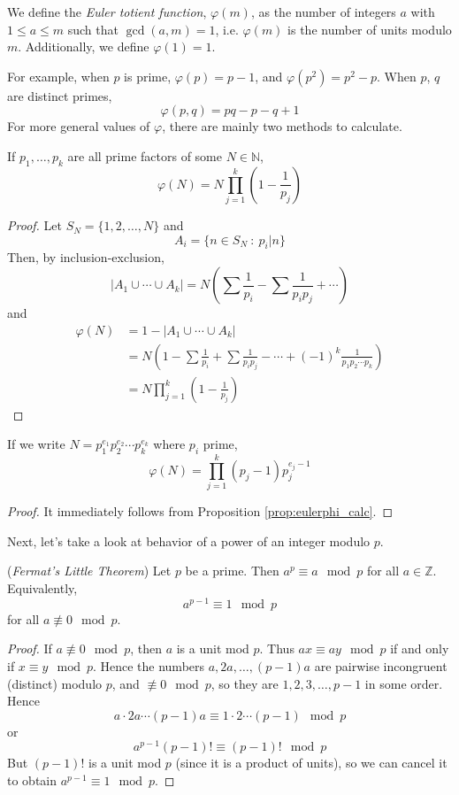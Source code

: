 \documentclass[10pt, a4paper, twoside]{report}
\begin{document}
\begin{definition}
    We define the \emph{Euler totient function}, \(\varphi(m)\), as the number of integers \(a\) with \(1\leq a\leq m\) such that \(\gcd(a,m)=1\), i.e. \(\varphi(m)\) is the number of units modulo \(m\). Additionally, we define \(\varphi(1)=1\).
\end{definition}
For example, when \(p\) is prime, \(\varphi(p)=p-1\), and \(\varphi(p^2)=p^2-p\). When \(p\), \(q\) are distinct primes,
\[\varphi(p,q)=pq-p-q+1\]
For more general values of \(\varphi\), there are mainly two methods to calculate.
\begin{proposition}
    If \(p_1,\ldots,p_k\) are all prime factors of some \(N\in\mathbb{N}\),
    \[\varphi(N)=N\prod_{j=1}^k\left(1-\frac{1}{p_j}\right)\]
    \label{prop:eulerphi_calc}
\end{proposition}
\begin{proof}
    Let \(S_N=\{1,2,\ldots,N\}\) and 
    \[A_i=\{n\in S_N\::\:p_i|n\}\]
    Then, by inclusion-exclusion,
    \[|A_1\cup\cdots\cup A_{k}|=N\left(\sum\frac 1{p_i}-\sum\frac 1{p_ip_j}+\cdots\right)\]
    and 
    \begin{align*}
        \varphi(N)&=1-|A_1\cup\cdots\cup A_{k}| \\
        &=N\left(1-\sum\frac 1{p_i}+\sum\frac 1{p_ip_j}-\cdots+(-1)^k\frac{1}{p_1p_2\cdots p_k}\right) \\
        &=N\prod_{j=1}^{k}\left(1-\frac 1{p_j}\right)
    \end{align*}
\end{proof}
\begin{corollary}
    If we write \(N=p_1^{e_1}p_2^{e_2}\cdots p_k^{e_k}\) where \(p_i\) prime, 
    \[\varphi(N)=\prod_{j=1}^{k}(p_j-1)p_j^{e_j-1}\]
\end{corollary}
\begin{proof}
    It immediately follows from Proposition \ref{prop:eulerphi_calc}.
\end{proof}
Next, let's take a look at behavior of a power of an integer modulo \(p\).
\begin{theorem}
    (\emph{Fermat's Little Theorem})
    Let \(p\) be a prime. Then \(a^p\equiv a\mod p\) for all \(a\in\mathbb{Z}\). Equivalently, 
    \[a^{p-1}\equiv 1\mod p\]
    for all \(a\nequiv 0\mod p\).
    \label{thm:flt}
\end{theorem}
\begin{proof}
    If \(a\nequiv 0\mod p\), then \(a\) is a unit mod \(p\). Thus \(ax\equiv ay\mod p\) if and only if \(x\equiv y\mod p\). Hence the numbers \(a,2a,\ldots,(p-1)a\) are pairwise incongruent (distinct) modulo \(p\), and \(\nequiv 0\mod p\), so they are \(1,2,3,\ldots,p-1\) in some order. Hence 
    \[a\cdot 2a\cdots(p-1)a\equiv 1\cdot2\cdots(p-1)\mod p\]
    or 
    \[a^{p-1}(p-1)!\equiv(p-1)!\mod p\]
    But \((p-1)!\) is a unit mod \(p\) (since it is a product of units), so we can cancel it to obtain \(a^{p-1}\equiv 1\mod p\).
\end{proof}
\end{document}
